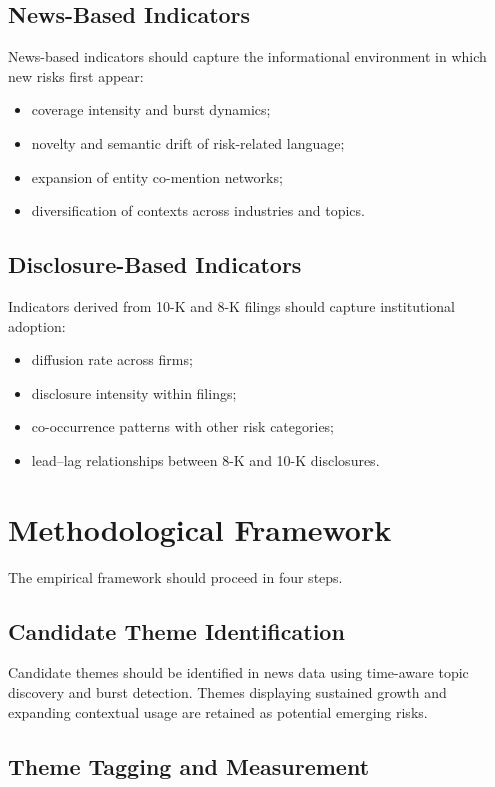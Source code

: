 \documentclass[11pt,a4paper]{article}
\begin{document}
\subsection{News-Based Indicators}

News-based indicators should capture the informational environment in which new risks first appear:
\begin{itemize}
\item coverage intensity and burst dynamics;
\item novelty and semantic drift of risk-related language;
\item expansion of entity co-mention networks;
\item diversification of contexts across industries and topics.
\end{itemize}

\subsection{Disclosure-Based Indicators}

Indicators derived from 10-K and 8-K filings should capture institutional adoption:
\begin{itemize}
\item diffusion rate across firms;
\item disclosure intensity within filings;
\item co-occurrence patterns with other risk categories;
\item lead--lag relationships between 8-K and 10-K disclosures.
\end{itemize}

\section{Methodological Framework}

The empirical framework should proceed in four steps.

\subsection{Candidate Theme Identification}

Candidate themes should be identified in news data using time-aware topic discovery and burst detection. Themes displaying sustained growth and expanding contextual usage are retained as potential emerging risks.

\subsection{Theme Tagging and Measurement}
\end{document}
